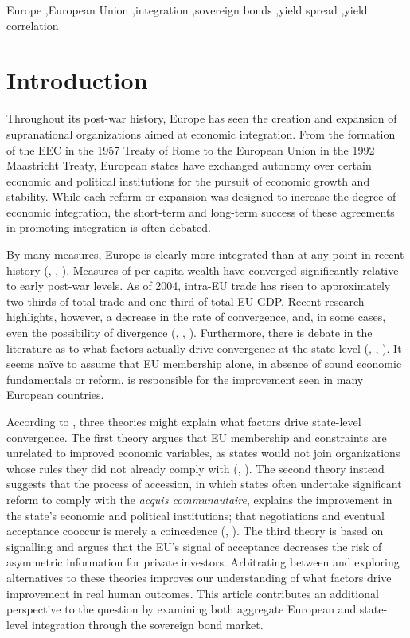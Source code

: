 \documentclass[3p]{elsarticle}
\begin{document}
\begin{frontmatter}
\begin{keyword}
Europe \sep European Union \sep integration \sep sovereign bonds \sep yield spread \sep yield correlation
\end{keyword}
\end{frontmatter}

\doublespacing

\section{Introduction}
Throughout its post-war history, Europe has seen the creation and expansion of supranational organizations aimed at economic integration.  From the formation of the EEC in the 1957 Treaty of Rome to the European Union in the 1992 Maastricht Treaty, European states have exchanged autonomy over certain economic and political institutions for the pursuit of economic growth and stability.  While each reform or expansion was designed to increase the degree of economic integration, the short-term and long-term success of these agreements in promoting integration is often debated.

By many measures, Europe is clearly more integrated than at any point in recent history (\cite{Molle1980}, \cite{Molle1988}, \cite{EC2006}).  Measures of per-capita wealth have converged significantly relative to early post-war levels.  As of 2004, intra-EU trade has risen to approximately two-thirds of total trade and one-third of total EU GDP.  Recent research highlights, however, a decrease in the rate of convergence, and, in some cases, even the possibility of divergence (\cite{Fagerberg1996}, \cite{Cappelen1999}, \cite{PenaCasas2009}).  Furthermore, there is debate in the literature as to what factors actually drive convergence at the state level (\cite{Brada2001}, \cite{Cappelen2003}, \cite{Gray2009}).  It seems na\"ive to assume that EU membership alone, in absence of sound economic fundamentals or reform, is responsible for the improvement seen in many European countries.

According to \cite{Gray2009}, three theories might explain what factors drive state-level convergence.  The first theory argues that EU membership and constraints are unrelated to improved economic variables, as states would not join organizations whose rules they did not already comply with (\cite{Downs1996}, \cite{VonStein2005}).  The second theory instead suggests that the process of accession, in which states often undertake significant reform to comply with the \textit{acquis communautaire},  explains the improvement in the state's economic and political institutions; that negotiations and eventual acceptance cooccur is merely a coincedence (\cite{Schimmelfennig2005}, \cite{Vachudova2001}).  The third theory is based on signalling and argues that the EU's signal of acceptance decreases the risk of asymmetric information for private investors.  Arbitrating between and exploring alternatives to these theories improves our understanding of what factors drive improvement in real human outcomes.  This article contributes an additional perspective to the question by examining both aggregate European and state-level integration through the sovereign bond market.  
\end{document}
